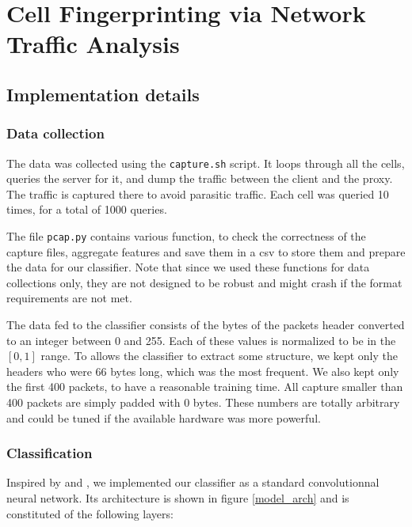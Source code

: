 \documentclass[10pt,conference,compsocconf]{IEEEtran}
\begin{document}
\section{Cell Fingerprinting via Network Traffic Analysis}

\subsection{Implementation details}
\subsubsection{Data collection}
The data was collected using the \verb|capture.sh| script. It loops through all the cells, queries the server for it, and dump the traffic between the client and the proxy. The traffic is captured there to avoid parasitic traffic. Each cell was queried 10 times, for a total of 1000 queries.

The file \verb|pcap.py| contains various function, to check the correctness of the capture files, aggregate features and save them in a csv to store them and prepare the data for our classifier. Note that since we used these functions for data collections only, they are not designed to be robust and might crash if the format requirements are not met. 

The data fed to the classifier consists of the bytes of the packets header converted to an integer between 0 and 255. Each of these values is normalized to be in the $[0,1]$ range. To allows the classifier to extract some structure, we kept only the headers who were 66 bytes long, which was the most frequent. We also kept only the first 400 packets, to have a reasonable training time. All capture smaller than 400 packets are simply padded with 0 bytes. These numbers are totally arbitrary and could be tuned if the available hardware was more powerful.

\subsubsection{Classification}
Inspired by \cite{tor_classification} and \cite{dl_encrypted}, we implemented our classifier as a standard convolutionnal neural network. Its architecture is shown in figure \ref{model_arch} and is constituted of the following layers:
\end{document}
